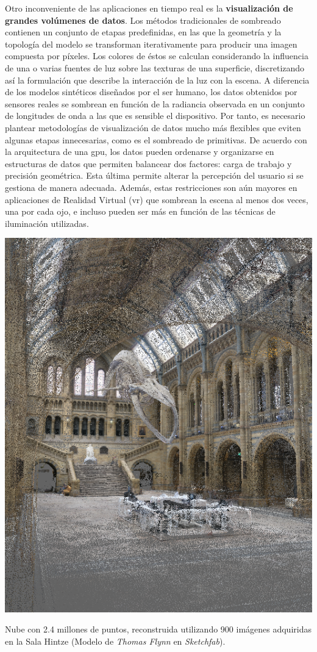Otro inconveniente de las aplicaciones en tiempo real es la \textbf{visualización de grandes volúmenes de datos}. Los métodos tradicionales de sombreado contienen un conjunto de etapas predefinidas, en las que la geometría y la topología del modelo se transforman iterativamente para producir una imagen compuesta por píxeles. Los colores de éstos se calculan considerando la influencia de una o varias fuentes de luz sobre las texturas de una superficie, discretizando así la formulación que describe la interacción de la luz con la escena. A diferencia de los modelos sintéticos diseñados por el ser humano, los datos obtenidos por sensores reales se sombrean en función de la radiancia observada en un conjunto de longitudes de onda a las que es sensible el dispositivo. Por tanto, es necesario plantear metodologías de visualización de datos mucho más flexibles que eviten algunas etapas innecesarias, como es el sombreado de primitivas. De acuerdo con la arquitectura de una \acrshort{gpu}, los datos pueden ordenarse y organizarse en estructuras de datos que permiten balancear dos factores: carga de trabajo y precisión geométrica. Esta última permite alterar la percepción del usuario si se gestiona de manera adecuada. Además, estas restricciones son aún mayores en aplicaciones de Realidad Virtual (\acrshort{vr}) que sombrean la escena al menos dos veces, una por cada ojo, e incluso pueden ser más en función de las técnicas de iluminación utilizadas.
\begin{marginfigure}[-7.5cm]
	\includegraphics{figs/introduction/hintze.png}
	\caption{Nube con 2.4 millones de puntos, reconstruida utilizando 900 imágenes adquiridas en la Sala Hintze (Modelo de \textit{Thomas Flynn} en \textit{Sketchfab}).  }
	\label{fig:hintze_hall_spanish}
\end{marginfigure}

